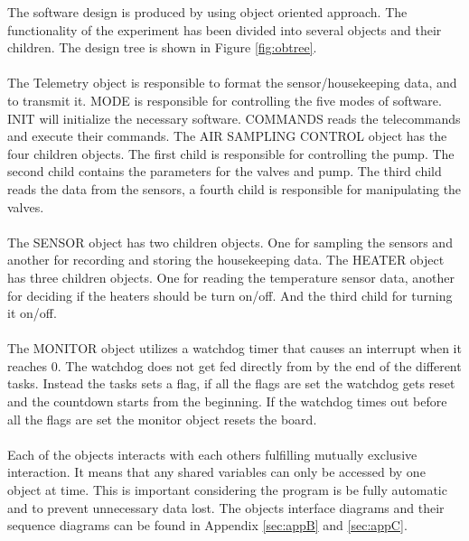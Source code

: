 \begin{enumerate}[label=(\alph*)]
The software design is produced by using object oriented approach. The functionality of the experiment has been divided into several objects and their children. The design tree is shown in Figure \ref{fig:obtree}.\\
\\
The Telemetry object is responsible to format the sensor/housekeeping data, and to transmit it. MODE is responsible for controlling the five modes of software. INIT will initialize the necessary software. COMMANDS reads the telecommands and execute their commands. The AIR SAMPLING CONTROL object has the four children objects. The first child is responsible for controlling the pump. The second child contains the parameters for the valves and pump. The third child reads the data from the sensors, a fourth child is responsible for manipulating the valves.\\
\\
The SENSOR object has two children objects. One for sampling the sensors and another for recording and storing the housekeeping data. The HEATER object has three children objects. One for reading the temperature sensor data, another for deciding if the heaters should be turn on/off. And the third child for turning it on/off.\\ 
\\
The MONITOR object utilizes a watchdog timer that causes an interrupt when it reaches 0. The watchdog does not get fed directly from by the end of the different tasks. Instead the tasks sets a flag, if all the flags are set the watchdog gets reset and the countdown starts from the beginning. If the watchdog times out before all the flags are set the monitor object resets the board.\\
\\
Each of the objects interacts with each others fulfilling mutually exclusive interaction. It means that any shared variables can only be accessed by one object at time. This is important considering the program is be fully automatic and to prevent unnecessary data lost. The objects interface diagrams and their sequence diagrams can be found in Appendix \ref{sec:appB} and \ref{sec:appC}.
\end{enumerate}
